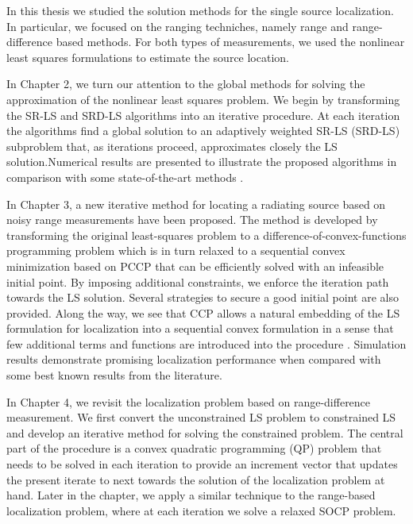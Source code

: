 
In this thesis we studied the solution methods for the single source localization. In particular, we focused on the ranging techniches, namely range and range-difference based methods. For both types of measurements, we used the nonlinear least squares formulations to estimate the source location. 

In Chapter 2, we turn our attention to the global methods for solving the approximation of the nonlinear least squares problem. We begin by
transforming the SR-LS and SRD-LS algorithms \cite{BeckStLi} into an
iterative procedure. At each iteration the algorithms find a global solution to an  adaptively weighted SR-LS (SRD-LS) subproblem that, as iterations proceed, approximates closely the LS solution.Numerical results are presented to illustrate the proposed algorithms in comparison with some state-of-the-art methods \cite{IRWSg}.


In Chapter 3,  a new iterative method for locating a radiating source based on noisy range measurements have been proposed. The method is developed by transforming the original least-squares problem to a difference-of-convex-functions programming problem which is in turn relaxed to a sequential convex minimization based on PCCP that can be efficiently solved with an infeasible initial point. By imposing additional constraints, we  enforce the iteration path towards the LS solution. Several strategies to secure a good initial point are also provided.  Along the way, we see that CCP allows a natural embedding of the LS formulation for localization into a sequential convex formulation in a sense that few additional terms and functions are introduced into the procedure \cite{PCCP}. Simulation results demonstrate promising localization performance when compared with some best known results from the literature.

In Chapter 4, we revisit the localization problem based on range-difference measurement. We first convert the unconstrained LS problem to constrained LS and develop an iterative method for solving the constrained problem.  The central part of the procedure is a convex quadratic programming (QP) problem that needs to be solved in each iteration to provide an increment vector that updates the present iterate to next towards the solution of the localization problem at hand. Later in the chapter, we apply a similar technique to the range-based localization problem, where at each iteration we solve a relaxed SOCP problem.


